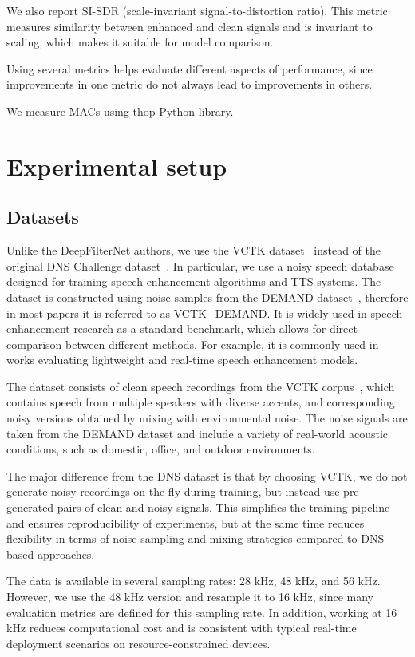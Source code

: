 \documentclass[a4paper,12pt]{extarticle}
\begin{document}
We also report SI-SDR (scale-invariant signal-to-distortion ratio). This metric measures similarity between enhanced and clean signals
and is invariant to scaling, which makes it suitable for model comparison.

Using several metrics helps evaluate different aspects of performance, since improvements in one metric do
not always lead to improvements in others.

We measure MACs using thop Python library.


\section{Experimental setup}

\subsection{Datasets}

Unlike the DeepFilterNet authors, we use the VCTK dataset~\cite{vctk} instead of the original DNS Challenge
dataset~\cite{dns}. In particular, we use a noisy speech database designed for training speech enhancement algorithms and
TTS systems. The dataset is constructed using noise samples from the DEMAND dataset~\cite{demand}, therefore in most
papers it is referred to as VCTK+DEMAND. It is widely used in speech enhancement research as a standard
benchmark, which allows for direct comparison between different methods. For example, it is commonly used
in works evaluating lightweight and real-time speech enhancement models.

The dataset consists of clean speech recordings from the VCTK corpus~\cite{vctkcorpus}, which contains speech from multiple
speakers with diverse accents, and corresponding noisy versions obtained by mixing with environmental noise.
The noise signals are taken from the DEMAND dataset and include a variety of real-world acoustic conditions,
such as domestic, office, and outdoor environments.

The major difference from the DNS dataset is that by choosing VCTK, we do not generate noisy recordings on-the-fly
during training, but instead use pre-generated pairs of clean and noisy signals. This simplifies the training
pipeline and ensures reproducibility of experiments, but at the same time reduces flexibility in terms of
noise sampling and mixing strategies compared to DNS-based approaches.

The data is available in several sampling rates: 28 kHz, 48 kHz, and 56 kHz. However, we use the 48 kHz
version and resample it to 16 kHz, since many evaluation metrics are defined for this sampling rate. In
addition, working at 16 kHz reduces computational cost and is consistent with typical real-time deployment
scenarios on resource-constrained devices.
\end{document}
